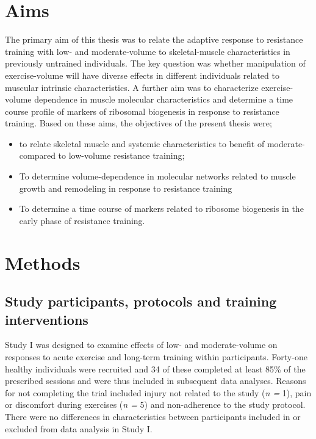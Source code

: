 \documentclass[twoside,10pt]{gihclass} %
\providecommand{\tightlist}{%
  \setlength{\itemsep}{0pt}\setlength{\parskip}{0pt}}
\begin{document}
\hypertarget{aims}{%
\chapter{Aims}\label{aims}}

The primary aim of this thesis was to relate the adaptive response to resistance training with low- and moderate-volume to skeletal-muscle characteristics in previously untrained individuals. The key question was whether manipulation of exercise-volume will have diverse effects in different individuals related to muscular intrinsic characteristics. A further aim was to characterize exercise-volume dependence in muscle molecular characteristics and determine a time course profile of markers of ribosomal biogenesis in response to resistance training. Based on these aims, the objectives of the present thesis were;
\begin{itemize}
\tightlist
\item
  to relate skeletal muscle and systemic characteristics to benefit of moderate- compared to low-volume resistance training;
\item
  To determine volume-dependence in molecular networks related to muscle growth and remodeling in response to resistance training
\item
  To determine a time course of markers related to ribosome biogenesis in the early phase of resistance training.
\end{itemize}
\hypertarget{methods}{%
\chapter{Methods}\label{methods}}

\hypertarget{study-participants-protocols-and-training-interventions}{%
\section{Study participants, protocols and training interventions}\label{study-participants-protocols-and-training-interventions}}

Study I was designed to examine effects of low- and moderate-volume on
responses to acute exercise and long-term training within participants.
Forty-one healthy individuals were recruited and 34 of these completed
at least 85\% of the prescribed sessions and were thus included in
subsequent data analyses. Reasons for not completing the trial included
injury not related to the study (\emph{n =} 1), pain or discomfort during
exercises (\emph{n =} 5) and non-adherence to the study protocol. There were
no differences in characteristics between participants included in or
excluded from data analysis in Study I.
\end{document}
